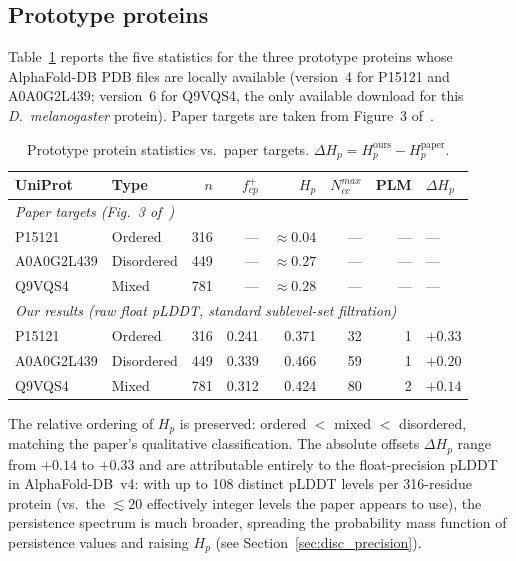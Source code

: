 \subsection{Prototype proteins}

Table~\ref{tab:prototypes} reports the five statistics for the three
prototype proteins whose AlphaFold-DB PDB files are locally available
(version~4 for P15121 and A0A0G2L439; version~6 for Q9VQS4, the only
available download for this \textit{D.~melanogaster} protein).
Paper targets are taken from Figure~3 of~\cite{cazals2025alphafold}.

\begin{table}[t]
\caption{Prototype protein statistics vs.\ paper targets.
$\Delta H_p = H_p^{\mathrm{ours}} - H_p^{\mathrm{paper}}$.}
\label{tab:prototypes}
\centering
\small
\begin{tabular}{llrrrrrl}
\toprule
UniProt & Type & $n$ & $f^+_{cp}$ & $H_p$ & $N_{cc}^{max}$ & PLM & $\Delta H_p$ \\
\midrule
\multicolumn{8}{l}{\textit{Paper targets (Fig.~3 of~\cite{cazals2025alphafold})}}\\
P15121     & Ordered     & 316 & ---    & $\approx\!0.04$ & --- & --- & ---\\
A0A0G2L439 & Disordered  & 449 & ---    & $\approx\!0.27$ & --- & --- & ---\\
Q9VQS4     & Mixed       & 781 & ---    & $\approx\!0.28$ & --- & --- & ---\\
\midrule
\multicolumn{8}{l}{\textit{Our results (raw float pLDDT, standard sublevel-set filtration)}}\\
P15121     & Ordered    & 316 & 0.241 & 0.371 & 32 & 1 & $+0.33$\\
A0A0G2L439 & Disordered & 449 & 0.339 & 0.466 & 59 & 1 & $+0.20$\\
Q9VQS4     & Mixed      & 781 & 0.312 & 0.424 & 80 & 2 & $+0.14$\\
\bottomrule
\end{tabular}
\end{table}

The relative ordering of $H_p$ is preserved: ordered $<$ mixed $<$ disordered,
matching the paper's qualitative classification.
The absolute offsets $\Delta H_p$ range from $+0.14$ to $+0.33$ and are
attributable entirely to the float-precision pLDDT in AlphaFold-DB~v4:
with up to 108 distinct pLDDT levels per 316-residue protein
(vs.\ the ${\lesssim}20$ effectively integer levels the paper appears to use),
the persistence spectrum is much broader, spreading the probability mass
function of persistence values and raising $H_p$ (see Section~\ref{sec:disc_precision}).

